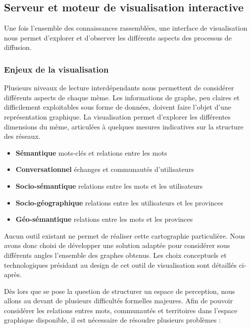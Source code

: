 \subsection{Serveur et moteur de visualisation interactive}


Une fois l'ensemble des connaissances rassemblées, une interface de visualisation nous permet d'explorer et d'observer les différents aspects des processus de diffusion.

\subsubsection{Enjeux de la visualisation} %
\label{ssub:enjeux_de_la_visualisation}

Plusieurs niveaux de lecture interdépendants nous permettent de considérer différents aspects de chaque mème. Les informations de graphe, peu claires et difficilement exploitables sous forme de données, doivent faire l'objet d'une représentation graphique. La visualisation permet d{\textquoteright}explorer les différentes dimensions du mème, articulées à quelques mesures indicatives sur la structure des réseaux.

\begin{itemize}
    \item \textbf{Sémantique} mots-clés et relations entre les mots
    \item \textbf{Conversationnel} échanges et communautés d{\textquoteright}utilisateurs 
    \item \textbf{Socio-sémantique} relations entre les mots et les utilisateurs
    \item \textbf{Socio-géographique} relations entre les utilisateurs et les provinces
    \item \textbf{Géo-sémantique} relations entre les mots et les provinces
\end{itemize}


Aucun outil existant ne permet de réaliser cette cartographie particulière. Nous avons donc choisi de développer une solution adaptée pour considérer sous différents angles l{\textquoteright}ensemble des graphes obtenus. Les choix conceptuels et technologiques présidant au design de cet outil de visualisation sont détaillés ci-après. 

Dès lors que se pose la question de structurer un espace de perception, nous allons au devant de plusieurs difficultés formelles majeures. Afin de pouvoir considérer les relations entres mots, communautés et territoires dans l{\textquoteright}espace graphique disponible, il est nécessaire de résoudre plusieurs problèmes :

